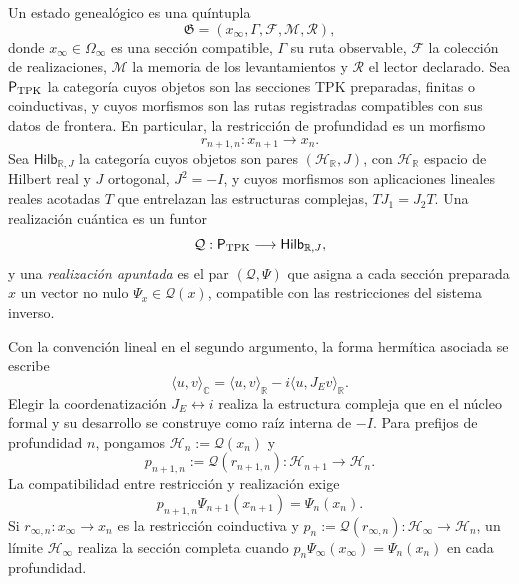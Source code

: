 \begin{definition}
\label{v:rec:realizacion_evolucion:statement:01}
Un estado genealógico es una quíntupla
\begin{equation}
 \mathfrak G=(x_\infty,\Gamma,\mathcal F,\mathcal M,\mathcal R),
 \label{v:rec:eq:estado-genealogico-realizado-rev2}
\end{equation}
donde \(x_\infty\in\Omega_\infty\) es una sección compatible,
\(\Gamma\) su ruta observable, \(\mathcal F\) la colección de realizaciones,
\(\mathcal M\) la memoria de los levantamientos y \(\mathcal R\) el lector
declarado. Sea \(\mathsf P_{\rm TPK}\) la categoría cuyos objetos son las
secciones TPK preparadas, finitas o coinductivas, y cuyos morfismos son las
rutas registradas compatibles con sus datos de frontera. En particular, la
restricción de profundidad es un morfismo
\[
 r_{n+1,n}:x_{n+1}\longrightarrow x_n.
\]
Sea \(\mathsf{Hilb}_{\mathbb R,J}\) la categoría cuyos objetos
son pares \((\mathcal H_{\mathbb R},J)\), con \(\mathcal H_{\mathbb R}\)
espacio de Hilbert real y \(J\) ortogonal, \(J^2=-I\), y cuyos morfismos son
aplicaciones lineales reales acotadas \(T\) que entrelazan las estructuras
complejas, \(TJ_1=J_2T\). Una realización cuántica es un funtor
\[
 \mathcal Q:\mathsf P_{\rm TPK}\longrightarrow
 \mathsf{Hilb}_{\mathbb R,J},
\]
y una \emph{realización apuntada} es el par \((\mathcal Q,\Psi)\) que asigna
a cada sección preparada \(x\) un vector no nulo
\(\Psi_x\in\mathcal Q(x)\), compatible con las restricciones del sistema
inverso.
\end{definition}

Con la convención lineal en el segundo argumento, la forma hermítica asociada
se escribe
\[
 \langle u,v\rangle_{\mathbb C}
 =\langle u,v\rangle_{\mathbb R}
  -i\langle u,J_E v\rangle_{\mathbb R}.
\]
Elegir la coordenatización \(J_E\leftrightarrow i\) realiza la estructura compleja que
en el núcleo formal y su desarrollo se construye como raíz interna de \(-I\). Para prefijos de
profundidad \(n\), pongamos
\(\mathcal H_n:=\mathcal Q(x_n)\) y
\[
 p_{n+1,n}:=\mathcal Q(r_{n+1,n}):
 \mathcal H_{n+1}\longrightarrow\mathcal H_n.
\]
La compatibilidad entre restricción y realización exige
\begin{equation}
 p_{n+1,n}\Psi_{n+1}(x_{n+1})=\Psi_n(x_n).
 \label{v:rec:eq:compatibilidad-realizacion-hilbert-rev2}
\end{equation}
Si \(r_{\infty,n}:x_\infty\to x_n\) es la restricción coinductiva y
\(p_n:=\mathcal Q(r_{\infty,n}):\mathcal H_\infty\to\mathcal H_n\), un
límite \(\mathcal H_\infty\) realiza la sección completa cuando
\(p_n\Psi_\infty(x_\infty)=\Psi_n(x_n)\) en cada profundidad.

